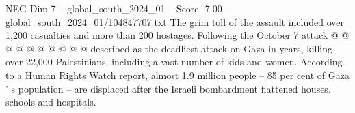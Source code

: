 \begin{textsample}{NEG Dim 7 – global\_south\_2024\_01 – Score -7.00 – global\_south\_2024\_01/104847707.txt}
The grim toll of the assault included over 1,200 casualties and more than 200 hostages.
Following the October 7 attack @ @ @ @ @ @ @ @ @ @ described as the deadliest attack on Gaza in years, killing over 22,000 Palestinians, including a vast number of kids and women.
According to a Human Rights Watch report, almost 1.9 million people -- 85 per cent of Gaza ' s population -- are displaced after the Israeli bombardment flattened houses, schools and hospitals.

\end{textsample}
